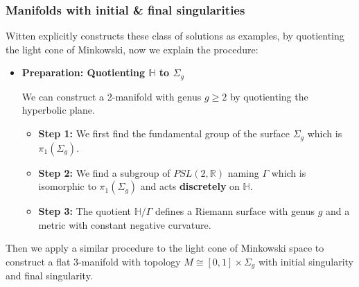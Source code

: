 \subsubsection{Manifolds with initial \& final singularities}

Witten explicitly constructs these class of solutions as examples, by
quotienting
the light cone of Minkowski, now we explain the procedure:

\begin{itemize}
  \item \textbf{Preparation: Quotienting $ \mathbb{H} $ to $ \Sigma_g $}

    We can construct a 2-manifold with genus $ g \geq 2 $ by
    quotienting the hyperbolic plane.
    \begin{itemize}
      \item \textbf{Step 1: } We first find the fundamental group of
        the surface $ \Sigma_g $ which is $ \pi_1(\Sigma_g) $.
      \item \textbf{Step 2: } We find a subgroup of $
        PSL(2,\mathbb{R}) $ naming $ \Gamma $
        which is isomorphic to $ \pi_1(\Sigma_g) $ and acts
        \textbf{discretely} on $ \mathbb{H} $.
      \item \textbf{Step 3: } The quotient $ \mathbb{H}/\Gamma  $
        defines a Riemann surface with genus $ g $ and a metric with
        constant negative curvature.
    \end{itemize}
\end{itemize}

Then we apply a similar procedure to the light cone of Minkowski space to
construct a flat 3-manifold with topology $ M \cong [0,1] \times
\Sigma_g $ with initial singularity and final singularity.

